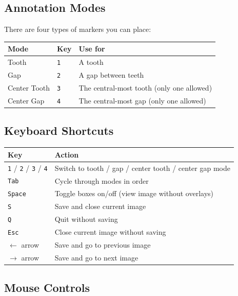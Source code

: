 \documentclass[11pt, letterpaper]{article}
\begin{document}
\subsection*{Annotation Modes}

There are four types of markers you can place:

\begin{center}
\begin{tabular}{lll}
\toprule
\textbf{Mode} & \textbf{Key} & \textbf{Use for} \\
\midrule
Tooth        & \texttt{1} & A tooth \\
Gap          & \texttt{2} & A gap between teeth \\
Center Tooth & \texttt{3} & The central-most tooth (only one allowed) \\
Center Gap   & \texttt{4} & The central-most gap (only one allowed) \\
\bottomrule
\end{tabular}
\end{center}

\subsection*{Keyboard Shortcuts}

\begin{center}
\begin{tabular}{ll}
\toprule
\textbf{Key} & \textbf{Action} \\
\midrule
\texttt{1} / \texttt{2} / \texttt{3} / \texttt{4} & Switch to tooth / gap / center tooth / center gap mode \\
\texttt{Tab}        & Cycle through modes in order \\
\texttt{Space}      & Toggle boxes on/off (view image without overlays) \\
\texttt{S}          & Save and close current image \\
\texttt{Q}          & Quit without saving \\
\texttt{Esc}        & Close current image without saving \\
$\leftarrow$ arrow  & Save and go to previous image \\
$\rightarrow$ arrow & Save and go to next image \\
\bottomrule
\end{tabular}
\end{center}

\subsection*{Mouse Controls}
\end{document}
